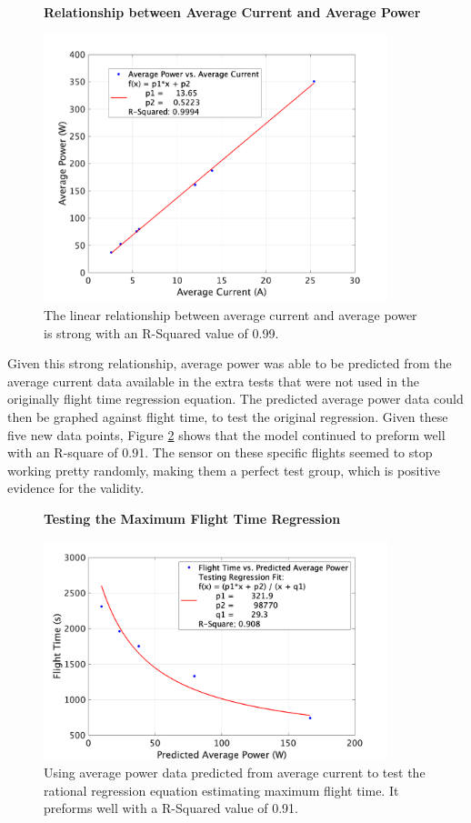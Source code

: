 \documentclass{article}
\begin{document}
\begin{figure}
  \centering
  \large{\textbf{Relationship between Average Current and Average Power}}\par
  \includegraphics[width = 100mm]{images/CurrToPwr.png}
  \caption{The linear relationship between average current and average power is strong with an R-Squared value of 0.99.}
  \label{fig:currtopwr}
\end{figure}

Given this strong relationship, average power was able to be predicted from the average current data available in the extra tests that were not used in the originally flight time regression equation. The predicted average power data could then be graphed against flight time, to test the original regression. Given these five new data points, Figure \ref{fig:usingpredictedpower} shows that the model continued to preform well with an R-square of 0.91. The sensor on these specific flights seemed to stop working pretty randomly, making them a perfect test group, which is positive evidence for the validity.

\begin{figure}
  \centering
  \large{\textbf{Testing the Maximum Flight Time Regression}}\par
  \includegraphics[width = 100mm]{images/UsingPredictedPower.png}
  \caption{Using average power data predicted from average current to test the rational regression equation estimating maximum flight time. It preforms well with a R-Squared value of 0.91.}
  \label{fig:usingpredictedpower}
\end{figure}
\end{document}
